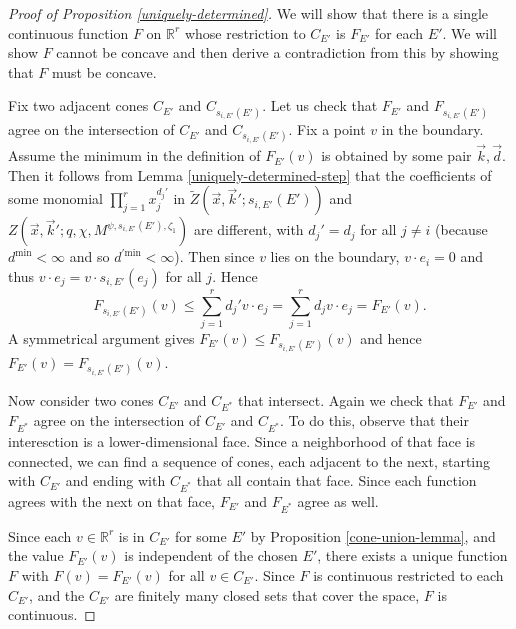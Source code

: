\documentclass[11pt,letterpaper]{article}
\theoremstyle{definition}
\theoremstyle{remark}
\numberwithin{equation}{section}
\theoremstyle{dotless}
\newcommand{\hchi}{\psi} %
\newcommand{\gene}{\zeta_1} %
\renewcommand{\tilde}{\widetilde}
\begin{document}
\begin{proof}[Proof of Proposition \ref{uniquely-determined}]
We will show that there is a single continuous function $F$ on $\mathbb R^r$ whose restriction to $C_{E'}$ is $F_{E'}$ for each $E'$. We will show $F$ cannot be concave and then derive a contradiction from this by showing that $F$ must be concave. 

Fix two adjacent cones $C_{E'}$ and $C_{ s_{i,E'}(E')}$. Let us check that $F_{E'}$ and $F_{s_{i,E'}(E')}$ agree on the intersection of $C_{E'}$ and $C_{ s_{i,E'}(E')}$. Fix a point $v$ in the boundary. Assume the minimum in the definition of $F_{E'}(v)$ is obtained by some pair $\vec{k},\vec{d}$.  Then it follows from Lemma \ref{uniquely-determined-step} that the coefficients of some monomial $\prod_{j=1}^r x_j^{d_j'}$ in $\tilde{Z} (\vec{x},\vec{k}'; s_{i,E'}(E'))$ and $Z(\vec{x}, \vec{k}' ; q, \chi, M^{\hchi, s_{i,E'}(E'),\gene}) $  are different, with $d_j'=d_j$ for all $j\neq i$ (because $d^{\mathrm{min}}<\infty$ and so $d^{'\mathrm{min}}<\infty$). Then since $v$ lies on the boundary, $v \cdot e_i=0$ and thus $v \cdot e_j = v \cdot s_{i,E'} (e_j)$ for all $j$.  Hence  \[ F_{ s_{i,E'}(E')} (v) \leq \sum_{j=1}^r d_j' v \cdot e_j = \sum_{j=1}^r d_j v \cdot e_j  = F_{E'}(v) .\] A symmetrical argument gives $ F_{E'}(v) \leq F_{ s_{i,E'}(E')} (v) $ and hence $ F_{E'}(v) = F_{ s_{i,E'}(E')} (v) $.

Now consider two cones $C_{E'}$ and $C_{E^*}$ that intersect. Again we check that $F_{E'}$ and $F_{E^*}$ agree on the intersection of $C_{E'}$ and $C_{E^*}$. To do this, observe that their interesction is a lower-dimensional face. Since a neighborhood of that face is connected, we can find a sequence of cones, each adjacent to the next, starting with $C_{E'}$ and ending with $C_{E^*}$ that all contain that face. Since each function agrees with the next on that face, $F_{E'}$ and $F_{E^*}$ agree as well.

Since each $v \in \mathbb R^r$ is in $C_{E'}$ for some $E'$ by Proposition \ref{cone-union-lemma}, and the value $F_{E'}(v)$ is independent of the chosen $E'$, there exists a unique function $F$ with $F (v) = F_{E'}(v)$ for all $v\in C_{E'}$. Since $F$ is continuous restricted to each $C_{E'}$, and the $C_{E'}$ are finitely many closed sets that cover the space, $F$ is continuous. 






\end{proof}
\end{document}
